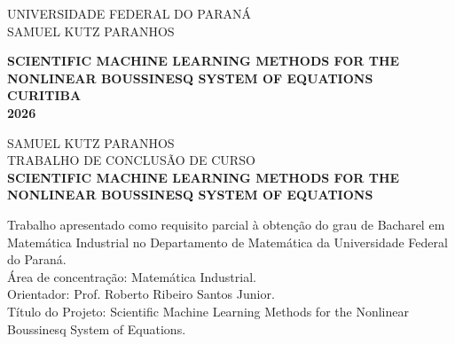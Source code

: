 

\AddToShipoutPicture*{\BackgroundPic}

\clearpage
\thispagestyle{empty}

\begin{bfseries}
\begin{center}

\vspace{0.5cm}
UNIVERSIDADE FEDERAL DO PARANÁ \\

\vspace{0.6cm}
SAMUEL KUTZ PARANHOS \\
\vspace{2.5cm}

\vspace*{1cm}
\textbf{\MakeUppercase{Scientific Machine Learning Methods for the \\ Nonlinear Boussinesq System of Equations}} \\


\vfill
\textbf{\MakeUppercase{CURITIBA}} \\
\textbf{\MakeUppercase{\textnormal{2026}}}
\end{center}
\end{bfseries}

\ClearShipoutPicture
\pagebreak

\thispagestyle{empty}

\begin{bfseries}
\begin{center}


\vspace{0.6cm}
SAMUEL KUTZ PARANHOS \\
\vspace{2.5cm}
TRABALHO DE CONCLUSÃO DE CURSO \\

\vspace*{1cm}
\textbf{\MakeUppercase{Scientific Machine Learning Methods for the \\ Nonlinear Boussinesq System of Equations}} \\
\end{center}
\end{bfseries}

\vfill
\begin{flushright}
\begin{minipage}{0.8\textwidth}
\raggedleft
\footnotesize
Trabalho apresentado como requisito parcial à obtenção do grau de Bacharel em Matemática Industrial no Departamento de Matemática da Universidade Federal do Paraná.\\[1ex]
Área de concentração: Matemática Industrial.\\[1ex]
Orientador: Prof. Roberto Ribeiro Santos Junior.\\[1ex]
Título do Projeto: Scientific Machine Learning Methods for the Nonlinear Boussinesq System of Equations.
\end{minipage}
\end{flushright}

